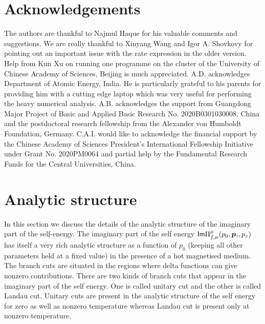 \documentclass[aps,prd,floatfix,showpacs,showkeys,superscriptadress,unsortedaddress,nofootinbib,onecolumn]{revtex4-1}
\newcommand{\shp}{\shortparallel}
\begin{document}
\section{Acknowledgements}
\label{sec:acknow}
The authors are thankful to Najmul Haque for his valuable comments and suggestions. We are really thankful to Xinyang Wang and Igor A. Shovkovy for pointing out an important issue with the rate expression in the older version. Help from Kun Xu on running one programme on the cluster of the University of Chinese Academy of Sciences, Beijing is much appreciated.  A.D. acknowledges Department of Atomic Energy, India. He is particularly grateful to his parents for providing him with a cutting edge laptop which was very useful for performing the heavy numerical analysis. A.B. acknowledges the support from Guangdong Major Project of Basic and Applied Basic Research No. 2020B0301030008,  China and the postdoctoral research fellowship from the Alexander von Humboldt Foundation, Germany. C.A.I. would like to acknowledge the financial support by the Chinese Academy of Sciences President's International Fellowship Initiative under Grant No. 2020PM0064 and partial help by the Fundamental Research Funds for the Central Universities, China.

\appendix
\section{Analytic structure} 
\label{app:ana_struc}
In this section we discuss the details of the analytic structure of the imaginary part of the self-energy. The imaginary part of the self energy $\textsf{Im}\Pi^{\mu}_{f,\mu}(p_0,\bm{p}_{\shp},p_z)$ has itself a very rich analytic structure as a function of $p_0$ (keeping all other parameters held at a fixed value) in the presence of a hot magnetised medium.  The branch cuts are situated in the regions where delta functions can give nonzero contributions. There are two kinds of branch cuts that appear in the imaginary part of the self energy. One is called unitary cut and the other is called Landau cut. Unitary cuts are present in the analytic structure of the self energy for zero as well as nonzero temperature whereas Landau cut is present only at nonzero temperature. 
\end{document}
